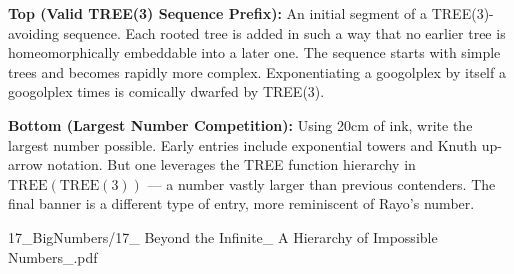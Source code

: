 \begin{SideNotePage}{
  \textbf{Top (Valid TREE(3) Sequence Prefix):}  
  An initial segment of a TREE(3)-avoiding sequence. Each rooted tree is added in such a way that no earlier tree is homeomorphically embeddable into a later one. The sequence starts with simple trees and becomes rapidly more complex. Exponentiating a googolplex by itself a googolplex times is comically dwarfed by TREE(3). \par

  \textbf{Bottom (Largest Number Competition):}  
  Using 20cm of ink, write the largest number possible. Early entries include exponential towers and Knuth up-arrow notation. But one leverages the TREE function hierarchy in $\text{TREE}(\text{TREE}(3))$ — a number vastly larger than previous contenders. The final banner is a different type of entry, more reminiscent of Rayo's number. \par
}{17_BigNumbers/17_ Beyond the Infinite_ A Hierarchy of Impossible Numbers_.pdf}
\end{SideNotePage}


